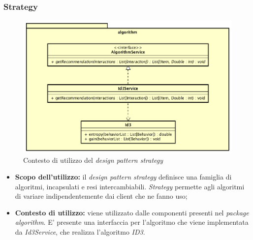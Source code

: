 \subsubsection{Strategy}
\begin{figure}[h]
\centering
\includegraphics[scale=0.30]{immagini/algorithm}
\caption{Contesto di utilizzo del \emph{design pattern strategy}}
\label{fig:pattern-strategy}
\end{figure}
\begin{itemize}
\item\textbf{Scopo dell'utilizzo:} il \emph{design pattern strategy} definisce una famiglia di algoritmi, incapsulati e resi intercambiabili. \emph{Strategy} permette agli algoritmi di variare indipendentemente dai client che ne fanno uso;
\item \textbf{Contesto di utilizzo:} viene utilizzato dalle componenti presenti nel \emph{package algorithm}. E' presente una interfaccia per l'algoritmo che viene implementata da \emph{Id3Service}, che realizza l'algoritmo \emph{ID3}.
\end{itemize}
